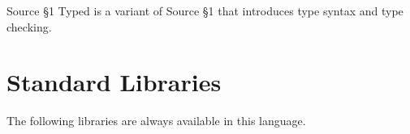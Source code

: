 





Source \S 1 Typed is a variant of Source \S 1 that introduces type syntax and type checking.





\newpage



















\section{Standard Libraries}

The following libraries are always available in this language.








